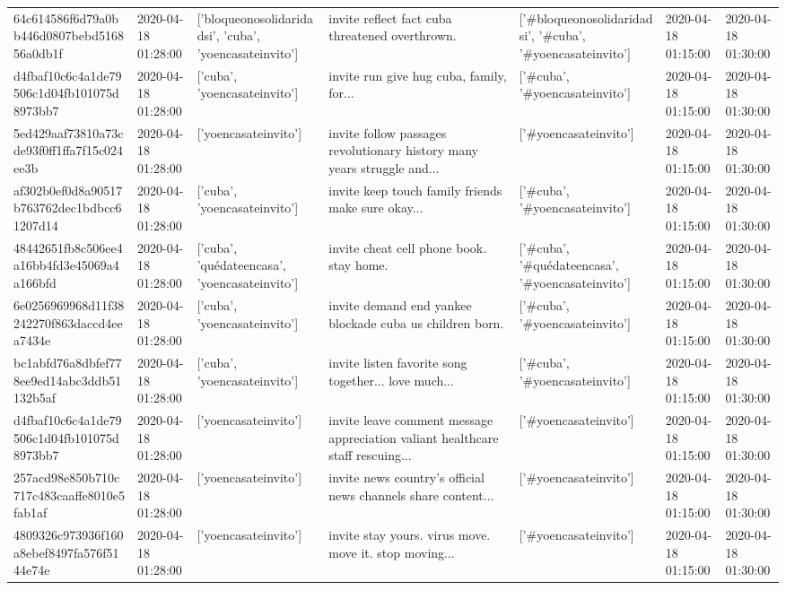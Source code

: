 \begin{tabular}{lllllll}
64c614586f6d79a0bb446d0807bebd516856a0db1f & 2020-04-18 01:28:00 & ['bloqueonosolidaridadsi', 'cuba', 'yoencasateinvito'] & invite reflect fact cuba threatened overthrown. & ['#bloqueonosolidaridadsi', '#cuba', '#yoencasateinvito'] & 2020-04-18 01:15:00 & 2020-04-18 01:30:00 \\
d4fbaf10c6c4a1de79506c1d04fb101075d8973bb7 & 2020-04-18 01:28:00 & ['cuba', 'yoencasateinvito'] & invite run give hug cuba, family, for... & ['#cuba', '#yoencasateinvito'] & 2020-04-18 01:15:00 & 2020-04-18 01:30:00 \\
5ed429aaf73810a73cde93f0ff1ffa7f15c024ee3b & 2020-04-18 01:28:00 & ['yoencasateinvito'] & invite follow passages revolutionary history many years struggle and... & ['#yoencasateinvito'] & 2020-04-18 01:15:00 & 2020-04-18 01:30:00 \\
af302b0ef0d8a90517b763762dec1bdbcc61207d14 & 2020-04-18 01:28:00 & ['cuba', 'yoencasateinvito'] & invite keep touch family friends make sure okay... & ['#cuba', '#yoencasateinvito'] & 2020-04-18 01:15:00 & 2020-04-18 01:30:00 \\
48442651fb8c506ee4a16bb4fd3e45069a4a166bfd & 2020-04-18 01:28:00 & ['cuba', 'quédateencasa', 'yoencasateinvito'] & invite cheat cell phone book. stay home. & ['#cuba', '#quédateencasa', '#yoencasateinvito'] & 2020-04-18 01:15:00 & 2020-04-18 01:30:00 \\
6e0256969968d11f38242270f863daccd4eea7434e & 2020-04-18 01:28:00 & ['cuba', 'yoencasateinvito'] & invite demand end yankee blockade cuba us children born. & ['#cuba', '#yoencasateinvito'] & 2020-04-18 01:15:00 & 2020-04-18 01:30:00 \\
bc1abfd76a8dbfef778ee9ed14abc3ddb51132b5af & 2020-04-18 01:28:00 & ['cuba', 'yoencasateinvito'] & invite listen favorite song together... love much... & ['#cuba', '#yoencasateinvito'] & 2020-04-18 01:15:00 & 2020-04-18 01:30:00 \\
d4fbaf10c6c4a1de79506c1d04fb101075d8973bb7 & 2020-04-18 01:28:00 & ['yoencasateinvito'] & invite leave comment message appreciation valiant healthcare staff rescuing... & ['#yoencasateinvito'] & 2020-04-18 01:15:00 & 2020-04-18 01:30:00 \\
257acd98e850b710c717c483caaffe8010e5fab1af & 2020-04-18 01:28:00 & ['yoencasateinvito'] & invite news country's official news channels share content... & ['#yoencasateinvito'] & 2020-04-18 01:15:00 & 2020-04-18 01:30:00 \\
4809326c973936f160a8ebef8497fa576f5144e74e & 2020-04-18 01:28:00 & ['yoencasateinvito'] & invite stay yours. virus move. move it. stop moving... & ['#yoencasateinvito'] & 2020-04-18 01:15:00 & 2020-04-18 01:30:00 \\

\end{tabular}
